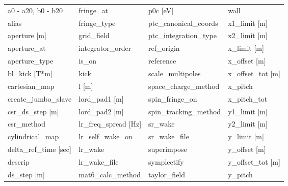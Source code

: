  \begin{tabular}{llll} \toprule
a0 - a20, b0 - b20               & fringe_at                        & p0c [eV]                         & wall                             \\
alias                            & fringe_type                      & ptc_canonical_coords             & x1_limit [m]                     \\
aperture [m]                     & grid_field                       & ptc_integration_type             & x2_limit [m]                     \\
aperture_at                      & integrator_order                 & ref_origin                       & x_limit [m]                      \\
aperture_type                    & is_on                            & reference                        & x_offset [m]                     \\
bl_kick [T*m]                    & kick                             & scale_multipoles                 & x_offset_tot [m]                 \\
cartesian_map                    & l [m]                            & space_charge_method              & x_pitch                          \\
create_jumbo_slave               & lord_pad1 [m]                    & spin_fringe_on                   & x_pitch_tot                      \\
csr_ds_step [m]                  & lord_pad2 [m]                    & spin_tracking_method             & y1_limit [m]                     \\
csr_method                       & lr_freq_spread [Hz]              & sr_wake                          & y2_limit [m]                     \\
cylindrical_map                  & lr_self_wake_on                  & sr_wake_file                     & y_limit [m]                      \\
delta_ref_time [sec]             & lr_wake                          & superimpose                      & y_offset [m]                     \\
descrip                          & lr_wake_file                     & symplectify                      & y_offset_tot [m]                 \\
ds_step [m]                      & mat6_calc_method                 & taylor_field                     & y_pitch                          \\

\end{tabular}
